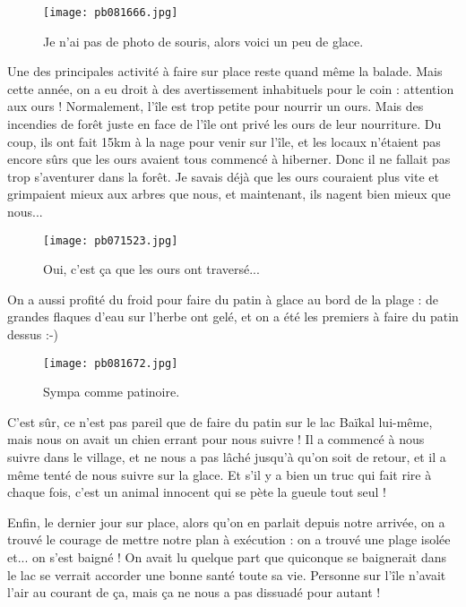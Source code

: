 \documentclass{book}
\begin{document}
\begin{figure}[h]
\centering
\texttt{[image: pb081666.jpg]}
\caption*{ Je n'ai pas de photo de souris, alors voici un peu de glace.}
\end{figure}

Une des principales activité à faire sur place reste quand même la balade. Mais cette année, on a eu droit à des avertissement inhabituels pour le coin : attention aux ours ! Normalement, l'île est trop petite pour nourrir un ours. Mais des incendies de forêt juste en face de l'île ont privé les ours de leur nourriture. Du coup, ils ont fait 15km à la nage pour venir sur l'île, et les locaux n'étaient pas encore sûrs que les ours avaient tous commencé à hiberner. Donc il ne fallait pas trop s'aventurer dans la forêt. Je savais déjà que les ours couraient plus vite et grimpaient mieux aux arbres que nous, et maintenant, ils nagent bien mieux que nous...


\begin{figure}[h]
\centering
\texttt{[image: pb071523.jpg]}
\caption*{ Oui, c'est ça que les ours ont traversé...}
\end{figure}

On a aussi profité du froid pour faire du patin à glace au bord de la plage : de grandes flaques d'eau sur l'herbe ont gelé, et on a été les premiers à faire du patin dessus :-)


\begin{figure}[h]
\centering
\texttt{[image: pb081672.jpg]}
\caption*{ Sympa comme patinoire.}
\end{figure}

C'est sûr, ce n'est pas pareil que de faire du patin sur le lac Baïkal lui-même, mais nous on avait un chien errant pour nous suivre ! Il a commencé à nous suivre dans le village, et ne nous a pas lâché jusqu'à qu'on soit de retour, et il a même tenté de nous suivre sur la glace. Et s'il y a bien un truc qui fait rire à chaque fois, c'est un animal innocent qui se pète la gueule tout seul !

Enfin, le dernier jour sur place, alors qu'on en parlait depuis notre arrivée, on a trouvé le courage de mettre notre plan à exécution : on a trouvé une plage isolée et... on s'est baigné ! On avait lu quelque part que quiconque se baignerait dans le lac se verrait accorder une bonne santé toute sa vie. Personne sur l'île n'avait l'air au courant de ça, mais ça ne nous a pas dissuadé pour autant !
\end{document}
